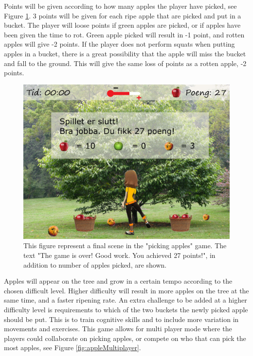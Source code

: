 Points will be given according to how many apples the player have picked, see Figure \ref{fig:appleOver}. 3 points will be given for each ripe apple that are picked and put in a bucket. The player will loose points if green apples are picked, or if apples have been given the time to rot. Green apple picked will result in -1 point, and rotten apples will give -2 points. If the player does not perform squats when putting apples in a bucket, there is a great possibility that the apple will miss the bucket and fall to the ground. This will give the same loss of points as a rotten apple, -2 points.       

\begin{figure} [H]
\centering
\includegraphics[scale=0.1]{appletreeend.jpg}
\caption[Picking apples - points]{This figure represent a final scene in the "picking apples" game. The text "The game is over! Good work. You achieved 27 points!", in addition to number of apples picked, are shown.}
\label{fig:appleOver}
\end{figure}

Apples will appear on the tree and grow in a certain tempo according to the chosen difficult level. Higher difficulty will result in more apples on the tree at the same time, and a faster ripening rate. An extra challenge to be added at a higher difficulty level is requirements to which of the two buckets the newly picked apple should be put. This is to train cognitive skills and to include more variation in movements and exercises. This game allows for multi player mode where the players could collaborate on picking apples, or compete on who that can pick the most apples, see Figure \ref{fig:appleMultiplayer}. 

